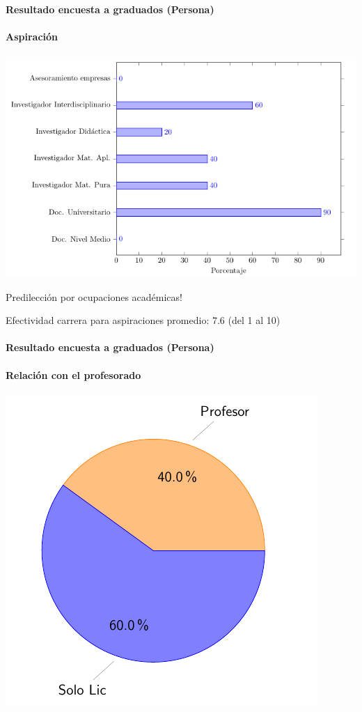 \documentclass[a4paper,10pt,BCOR10mm,oneside,headsepline]{scrbook}
\begin{document}
\paragraph{Resultado encuesta a graduados (Persona) }
\paragraph{Aspiración }
\includegraphics[scale=.5]{barras9.png}

Predilección por ocupaciones académicas!

Efectividad carrera para aspiraciones promedio: 7.6 (del 1 al 10)




\paragraph{Resultado encuesta a graduados (Persona)}
\paragraph{Relación con el profesorado }
\includegraphics[scale=.4]{torta3.png}
\end{document}
